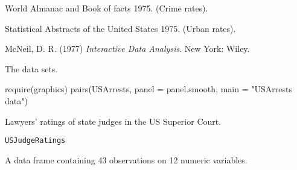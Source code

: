 %
\begin{Source}\relax
World Almanac and Book of facts 1975.  (Crime rates).

Statistical Abstracts of the United States 1975.  (Urban rates).
\end{Source}
%
\begin{References}\relax
McNeil, D. R. (1977)
\emph{Interactive Data Analysis}.
New York: Wiley.
\end{References}
%
\begin{SeeAlso}\relax
The  data sets.
\end{SeeAlso}
%
\begin{Examples}
\begin{ExampleCode}
require(graphics)
pairs(USArrests, panel = panel.smooth, main = "USArrests data")
\end{ExampleCode}
\end{Examples}
%
\begin{Description}\relax
Lawyers' ratings of state judges in the US Superior Court.
\end{Description}
%
\begin{Usage}
\begin{verbatim}
USJudgeRatings
\end{verbatim}
\end{Usage}
%
\begin{Format}
A data frame containing 43 observations on 12 numeric variables.

\end{Format}
